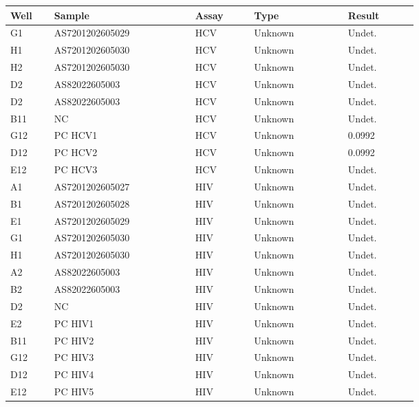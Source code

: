 \documentclass[UTF8,10pt,a4paper,fontset=fandol]{ctexart}
\begin{document}

\newpage

\small
\begin{center}
\begin{tabular}{|p{0.07\linewidth}|p{0.24\linewidth}|p{0.10\linewidth}|p{0.16\linewidth}|p{0.12\linewidth}|}
\hline
\textbf{Well} & \textbf{Sample} & \textbf{Assay} & \textbf{Type} & \textbf{Result} \\
\hline
G1  & AS7201202605029 & HCV & Unknown & Undet. \\
H1  & AS7201202605030 & HCV & Unknown & Undet. \\
H2  & AS7201202605030 & HCV & Unknown & Undet. \\
D2  & AS82022605003  & HCV & Unknown & Undet. \\
D2  & AS82022605003  & HCV & Unknown & Undet. \\
B11 & NC              & HCV & Unknown & Undet. \\
G12 & PC HCV1         & HCV & Unknown & 0.0992 \\
D12 & PC HCV2         & HCV & Unknown & 0.0992 \\
E12 & PC HCV3         & HCV & Unknown & Undet. \\
\hline
A1  & AS7201202605027 & HIV & Unknown & Undet. \\
B1  & AS7201202605028 & HIV & Unknown & Undet. \\
E1  & AS7201202605029 & HIV & Unknown & Undet. \\
G1  & AS7201202605030 & HIV & Unknown & Undet. \\
H1  & AS7201202605030 & HIV & Unknown & Undet. \\
A2  & AS82022605003  & HIV & Unknown & Undet. \\
B2  & AS82022605003  & HIV & Unknown & Undet. \\
D2  & NC              & HIV & Unknown & Undet. \\
E2  & PC HIV1         & HIV & Unknown & Undet. \\
B11 & PC HIV2         & HIV & Unknown & Undet. \\
G12 & PC HIV3         & HIV & Unknown & Undet. \\
D12 & PC HIV4         & HIV & Unknown & Undet. \\
E12 & PC HIV5         & HIV & Unknown & Undet. \\
\hline

\end{tabular}
\end{center}
\end{document}
